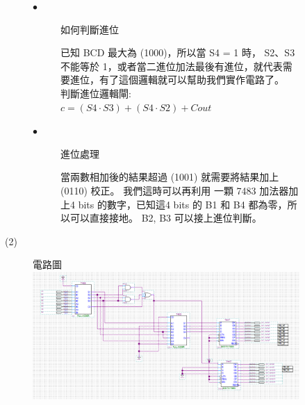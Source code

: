 \documentclass[12pt, a4paper]{article}
\begin{document}
\begin{description}
\begin{description}
\begin{description}
\begin{samepage}
                    \begin{description}
                      \bf
                      \item[$\bullet$] 如何判斷進位 \\
                        \begin{samepage}
                          \normalfont
                          已知 BCD 最大為 (1000)，所以當 S4 = 1 時， S2、S3 不能等於 1，或者當二進位加法最後有進位，就代表需要進位，有了這個邏輯就可以幫助我們實作電路了。\\[.5cm]
                          判斷進位邏輯閘:\\
                          $c = (S4\cdot S3) + (S4\cdot S2) + Cout$
                        \end{samepage}

                      \item[$\bullet$] 進位處理 \\
                      \begin{samepage}
                        \normalfont
                        當兩數相加後的結果超過 (1001) 就需要將結果加上 (0110) 校正。
                        我們這時可以再利用 一顆 7483 加法器加上4 bits 的數字，已知這4 bits 的 B1 和 B4 都為零，所以可以直接接地。
                        B2, B3 可以接上進位判斷。
                      \end{samepage}                        
                    \end{description}
                  
                \end{samepage}
              
              \item [(2)] 電路圖 \\[.5cm]
                \includegraphics[width=13cm]{./image/ex1.png} \\
            \end{description}


\end{description}
\end{description}
\end{document}
